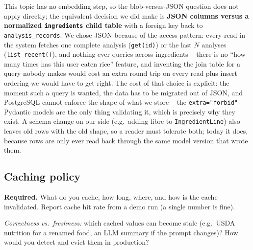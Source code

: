 \documentclass[11pt,a4paper]{article}
\newenvironment{deliverbox}{\begin{deliverboxshown}}{\end{deliverboxshown}}
\newenvironment{probebox}{\begin{probeboxshown}}{\end{probeboxshown}}
\newenvironment{deliverbox}{\setbox0\vbox\bgroup}{\egroup\ignorespacesafterend}
\newenvironment{probebox}{\setbox0\vbox\bgroup}{\egroup\ignorespacesafterend}
\begin{document}
\par\noindent
This topic has no embedding step, so the blob-versus-JSON question does not
apply directly; the equivalent decision we did make is \textbf{JSON columns
versus a normalized \texttt{ingredients} child table} with a foreign key
back to \texttt{analysis\_records}. We chose JSON because of the access
pattern: every read in the system fetches one complete analysis
(\texttt{get(id)}) or the last $N$ analyses (\texttt{list\_recent()}), and
nothing ever queries across ingredients -- there is no ``how many times has
this user eaten rice'' feature, and inventing the join table for a query
nobody makes would cost an extra round trip on every read plus insert
ordering we would have to get right. The cost of that choice is explicit:
the moment such a query is wanted, the data has to be migrated out of JSON,
and PostgreSQL cannot enforce the shape of what we store -- the
\texttt{extra="forbid"} Pydantic models are the only thing validating it,
which is precisely why they exist. A schema change on our side
(e.g.\ adding fibre to \texttt{IngredientLine}) also leaves old rows with
the old shape, so a reader must tolerate both; today it does, because rows
are only ever read back through the same model version that wrote them.

\subsection{Caching policy}

\begin{deliverbox}
\textbf{Required.} What do you cache, how long, where, and how is the cache invalidated. Report cache hit rate from a demo run (a single number is fine).
\end{deliverbox}

\begin{probebox}
\textit{Correctness vs.\ freshness:} which cached values can become stale (e.g.\ USDA nutrition for a renamed food, an LLM summary if the prompt changes)? How would you detect and evict them in production?
\end{probebox}
\end{document}
